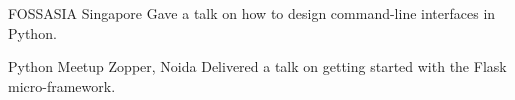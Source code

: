     {FOSSASIA}
    {}
    {Singapore}
    {}
    {
        Gave a talk on how to design command-line interfaces in Python.
    }
    \vspace*{0.2\baselineskip}

    {Python Meetup}
    {}
    {Zopper, Noida}
    {}
    {
        Delivered a talk on getting started with the Flask micro-framework.
    }
